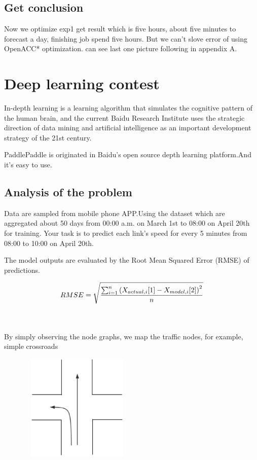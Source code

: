 \documentclass[conference,compsoc]{appendix/report}
\begin{document}
\subsection{Get conclusion}
Now we optimize exp1 get result which is five hours, about five minutes to forecast a day, finishing job spend five hours. But we can't slove error of using OpenACC* optimization. can see last one picture following in appendix A.


\section{Deep learning contest}
In-depth learning is a learning algorithm that simulates the cognitive pattern of the human brain, and the current Baidu Research Institute uses the strategic direction of data mining and artificial intelligence as an important development strategy of the 21st century.

PaddlePaddle is originated in Baidu's open source depth learning platform.And it's easy to use.

\subsection{Analysis of the problem}
Data are sampled from mobile phone APP.Using the dataset which are aggregated about 50 days from 00:00 a.m. on March 1st to 08:00 on April 20th for training. Your task is to predict each link's speed for every 5 minutes from 08:00 to 10:00 on April 20th.

The model outputs are evaluated by the Root Mean Squared Error (RMSE) of
predictions.

$$RMSE = \sqrt{\frac{ \sum_{i=1}^{n} \left ({X}_{actual, i} [1] - {X}_{model, i} [2] \right )^{2}}{n} }$$


\\
\\
By simply observing the node graphs, we map the traffic nodes, for example, simple crossroads

\includegraphics[width=3.00in,height=2.00in]{appendix/crossroads.eps}
\end{document}

